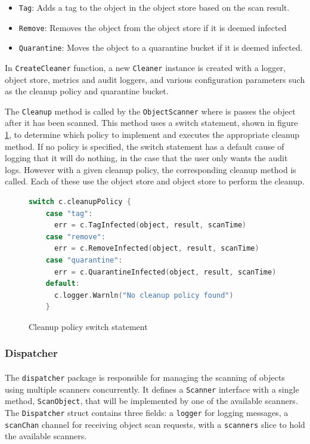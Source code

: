 \documentclass[12pt, conference, final, a4paper, onecolumn, compsoc]{IEEEtran}
\begin{document}
\begin{itemize}
  \item \texttt{Tag}: Adds a tag to the object in the object store based on the
        scan result.
  \item \texttt{Remove}: Removes the object from the object store if it is
        deemed infected
  \item \texttt{Quarantine}: Moves the object to a quarantine bucket if it is
        deemed infected.
\end{itemize}

In \texttt{CreateCleaner} function, a new \texttt{Cleaner} instance is created
with a logger, object store, metrics and audit loggers, and various
configuration parameters such as the cleanup policy and quarantine bucket.

The \texttt{Cleanup} method is called by the \texttt{ObjectScanner} where is
passes the object after it has been scanned. This method uses a switch
statement, shown in figure \ref{fig:cleaner-switch}, to determine which policy
to implement and executes the appropriate cleanup method. If no policy is
specified, the switch statement has a default cause of logging that it will do
nothing, in the case that the user only wants the audit logs. However with a
given cleanup policy, the corresponding cleanup method is called. Each of these
use the object store and object store to perform the cleanup.

\begin{figure}[H]
\begin{lstlisting}[language=Go]
    switch c.cleanupPolicy {
    case "tag":
      err = c.TagInfected(object, result, scanTime)
    case "remove":
      err = c.RemoveInfected(object, result, scanTime)
    case "quarantine":
      err = c.QuarantineInfected(object, result, scanTime)
    default:
      c.logger.Warnln("No cleanup policy found")
    }
\end{lstlisting}
  \caption{Cleanup policy switch statement}
  \label{fig:cleaner-switch}
\end{figure}

\subsubsection*{Dispatcher}
\paragraph{}

The \texttt{dispatcher} package is responsible for managing the scanning of
objects using multiple scanners concurrently. It defines a \texttt{Scanner}
interface with a single method, \texttt{ScanObject}, that will be implemented by
one of the available scanners. The \texttt{Dispatcher} struct contains three
fields: a \texttt{logger} for logging messages, a \texttt{scanChan} channel for
receiving object scan requests, with a \texttt{scanners} slice to hold the
available scanners.
\end{document}
